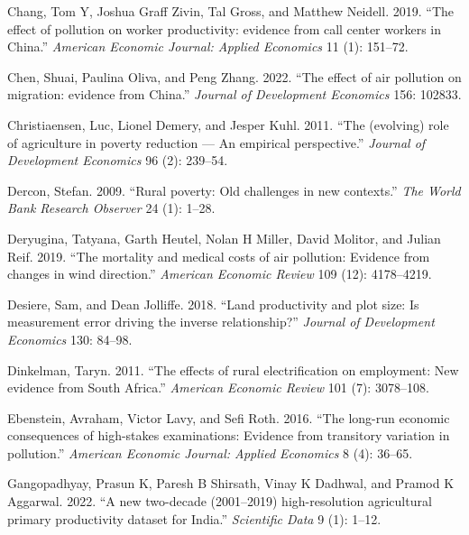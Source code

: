 \documentclass[
]{article}
\newlength{\cslhangindent}
\newlength{\cslentryspacingunit} %
\newenvironment{CSLReferences}[2] %
 {%
  \setlength{\parindent}{0pt}
  \ifodd #1
  \let\oldpar\par
  \def\par{\hangindent=\cslhangindent\oldpar}
  \fi
  \setlength{\parskip}{#2\cslentryspacingunit}
 }%
 {}
\begin{document}
\begin{CSLReferences}{1}{0}
\leavevmode{}%
Chang, Tom Y, Joshua Graff Zivin, Tal Gross, and Matthew Neidell. 2019. {``{The effect of pollution on worker productivity: evidence from call center workers in China}.''} \emph{{American Economic Journal: Applied Economics}} 11 (1): 151--72.

\leavevmode{}%
Chen, Shuai, Paulina Oliva, and Peng Zhang. 2022. {``{The effect of air pollution on migration: evidence from China}.''} \emph{{Journal of Development Economics}} 156: 102833.

\leavevmode{}%
Christiaensen, Luc, Lionel Demery, and Jesper Kuhl. 2011. {``{The (evolving) role of agriculture in poverty reduction --- An empirical perspective}.''} \emph{{Journal of Development Economics}} 96 (2): 239--54.

\leavevmode{}%
Dercon, Stefan. 2009. {``{Rural poverty: Old challenges in new contexts}.''} \emph{{The World Bank Research Observer}} 24 (1): 1--28.

\leavevmode{}%
Deryugina, Tatyana, Garth Heutel, Nolan H Miller, David Molitor, and Julian Reif. 2019. {``{The mortality and medical costs of air pollution: Evidence from changes in wind direction}.''} \emph{{American Economic Review}} 109 (12): 4178--4219.

\leavevmode{}%
Desiere, Sam, and Dean Jolliffe. 2018. {``{Land productivity and plot size: Is measurement error driving the inverse relationship?}''} \emph{{Journal of Development Economics}} 130: 84--98.

\leavevmode{}%
Dinkelman, Taryn. 2011. {``{The effects of rural electrification on employment: New evidence from South Africa}.''} \emph{{American Economic Review}} 101 (7): 3078--108.

\leavevmode{}%
Ebenstein, Avraham, Victor Lavy, and Sefi Roth. 2016. {``{The long-run economic consequences of high-stakes examinations: Evidence from transitory variation in pollution}.''} \emph{{American Economic Journal: Applied Economics}} 8 (4): 36--65.

\leavevmode{}%
Gangopadhyay, Prasun K, Paresh B Shirsath, Vinay K Dadhwal, and Pramod K Aggarwal. 2022. {``{A new two-decade (2001--2019) high-resolution agricultural primary productivity dataset for India}.''} \emph{{Scientific Data}} 9 (1): 1--12.


\end{CSLReferences}
\end{document}
